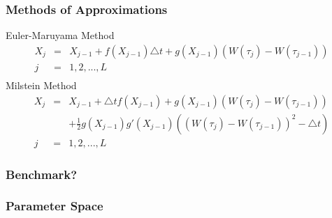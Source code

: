 \begin{frame}
    \frametitle{Methods of Approximations}
	Euler-Maruyama Method
	\begin{eqnarray*}
		X_{j} &=& X_{j-1} + f(X_{j-1})\triangle t+ g(X_{j-1})(W(\tau_{j})-W(\tau_{j-1})) \\
		 j &=& 1,2,... ,L \\
	\end{eqnarray*}
	Milstein Method
	\begin{eqnarray*}
		X_{j} &=& X_{j-1} + \triangle tf(X_{j-1}) + g(X_{j-1})(W(\tau_{j})-W(\tau_{j-1})) 	\nonumber\\ 
		&& + \frac{1}{2} g(X_{j-1})g'(X_{j-1})((W(\tau_{j})-W(\tau_{j-1}))^{2}-\triangle t)
		\\ j &=& 1,2,... ,L		
	\end{eqnarray*}
\end{frame}


\begin{frame}
    \frametitle{Benchmark?}
\end{frame}


\begin{frame}
    \frametitle{Parameter Space}
\end{frame}




